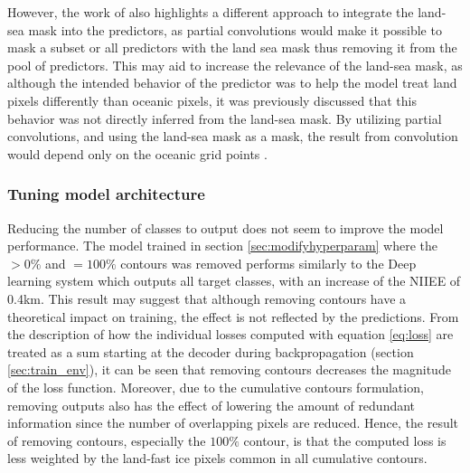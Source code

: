 \documentclass[../main/thesis]{subfiles}
\begin{document}
However, the work of \cite{Liu2018} also highlights a different approach to integrate the land-sea mask into the predictors, as partial convolutions would make it possible to mask a subset or all predictors with the land sea mask thus removing it from the pool of predictors. This may aid to increase the relevance of the land-sea mask, as although the intended behavior of the predictor was to help the model treat land pixels differently than oceanic pixels, it was previously discussed that this behavior was not directly inferred from the land-sea mask. By utilizing partial convolutions, and using the land-sea mask as a mask, the result from convolution would depend only on the oceanic grid points \citep{Liu2018}.

\subsubsection{Tuning model architecture}
Reducing the number of classes to output does not seem to improve the model performance. The model trained in section \ref{sec:modifyhyperparam} where the $> 0\%$ and $=100\%$ contours was removed performs similarly to the Deep learning system which outputs all target classes, with an increase of the NIIEE of 0.4km. This result may suggest that although removing contours have a theoretical impact on training, the effect is not reflected by the predictions. From the description of how the individual losses computed with equation \ref{eq:loss} are treated as a sum starting at the decoder during backpropagation (section \ref{sec:train_env}), it can be seen that removing contours decreases the magnitude of the loss function. Moreover, due to the cumulative contours formulation, removing outputs also has the effect of lowering the amount of redundant information since the number of overlapping pixels are reduced. Hence, the result of removing contours, especially the $100\%$ contour, is that the computed loss is less weighted by the land-fast ice pixels common in all cumulative contours.
\end{document}
